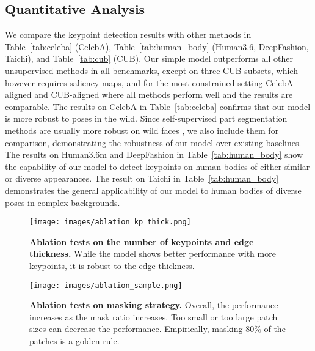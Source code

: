 \documentclass{article}
\begin{document}
\subsection{Quantitative Analysis} \label{sec:quantitative}

We compare the keypoint detection results with other methods in Table~\ref{tab:celeba} (CelebA), Table~\ref{tab:human_body} (Human3.6, DeepFashion, Taichi), and Table~\ref{tab:cub} (CUB).
Our simple model outperforms all other unsupervised methods in all benchmarks, except \cite{hung2019scops} on three CUB subsets, which however requires saliency maps, and for the most constrained setting CelebA-aligned and CUB-aligned where all methods perform well and the results are comparable. 
The results on CelebA in Table~\ref{tab:celeba} confirms that our model is more robust to poses in the wild. Since self-supervised part segmentation methods are usually more robust on wild faces \cite{liu2021unsupervised, hung2019scops, he2022ganseg}, we also include them for comparison, demonstrating the robustness of our model over existing baselines.
The results on Human3.6m and DeepFashion in Table~\ref{tab:human_body} show the capability of our model to detect keypoints on human bodies of either similar or diverse appearances.
The result on Taichi in Table~\ref{tab:human_body} demonstrates the general applicability of our model to human bodies of diverse poses in complex backgrounds.

\begin{figure}[t]
\begin{center}
  \texttt{[image: images/ablation\_kp\_thick.png]}
\end{center}
   \caption{\textbf{Ablation tests on the number of keypoints and edge thickness.} While the model shows better performance with more keypoints, it is robust to the edge thickness.}
\label{fig:ablation_kp_thick}
\end{figure}

\begin{figure}[t]
\begin{center}
  \texttt{[image: images/ablation\_sample.png]}
\end{center}
   \caption{\textbf{Ablation tests on masking strategy.} Overall, the performance increases as the mask ratio increases. Too small or too large patch sizes can decrease the performance. Empirically, masking 80\% of the  patches is a golden rule.}
\label{fig:ablation_masking}
\end{figure}
\end{document}
